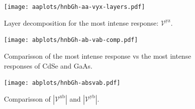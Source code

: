 \documentclass{article}
\begin{document}
\begin{figure}[ht]
    \centering
    \texttt{[image: aaplots/hnbGh-aa-vyx-layers.pdf]}
    \caption{Layer decomposition for the most intense response:
    $\mathcal{V}^{\mathrm{yz}}$.}
    \label{fig:aa-lay}
\end{figure}

\begin{figure}[ht]
    \centering
    \texttt{[image: abplots/hnbGh-ab-vab-comp.pdf]}
    \caption{Comparisson of the most intense response vs the most intense
    responses of CdSe and GaAs.}
    \label{fig:ab-comp}
\end{figure}


\begin{figure}[h]
    \centering
    \texttt{[image: abplots/hnbGh-absvab.pdf]}
    \caption{Comparisson of $|\mathcal{V}^{\mathrm{xb}}|$ and $|\mathcal{V}^{\mathrm{yb}}|$.}    
    \label{fig:ab-xbybcomp}
\end{figure}


\end{document}
